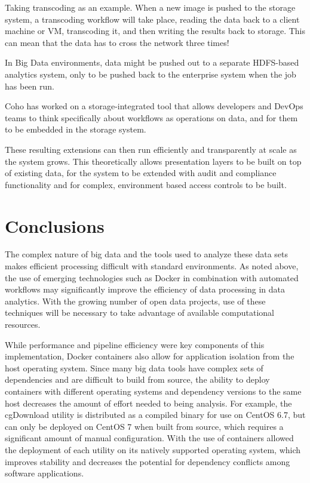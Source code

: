 \documentclass[sigconf]{acmart}
\begin{document}
	Taking transcoding as an example. When a new image is pushed to the storage system, a transcoding workflow will take place, reading the data back to a client machine or VM, transcoding it, and then writing the results back to storage. This can mean that the data has to cross the network three times!
	
	In Big Data environments, data might be pushed out to a separate HDFS-based analytics system, only to be pushed back to the enterprise system when the job has been run.\cite{Coho}
	
	Coho has worked on a storage-integrated tool that allows developers and DevOps teams to think specifically about workflows as operations on data, and for them to be embedded in the storage system.
	
	These resulting extensions can then run efficiently and transparently at scale as the system grows. This theoretically allows presentation layers to be built on top of existing data, for the system to be extended with audit and compliance functionality and for complex, environment based access controls to be built.
	
	\section{Conclusions}
	
	The complex nature of big data and the tools used to analyze these data sets makes efficient processing difficult with standard environments. As noted above, the use of emerging technologies such as Docker in combination with automated workflows may significantly improve the efficiency of data processing in data analytics. With the growing number of open data projects, use of these techniques will be necessary to take advantage of available computational resources.
	
	While performance and pipeline efficiency were key components of this implementation, Docker containers also allow for application isolation from the host operating system. Since many big data tools have complex sets of dependencies and are difficult to build from source, the ability to deploy containers with different operating systems and dependency versions to the same host decreases the amount of effort needed to being analysis. For example, the cgDownload utility is distributed as a compiled binary for use on CentOS 6.7, but can only be deployed on CentOS 7 when built from source, which requires a significant amount of manual configuration. With the use of containers allowed the deployment of each utility on its natively supported operating system, which improves stability and decreases the potential for dependency conflicts among software applications.
	
\end{document}
